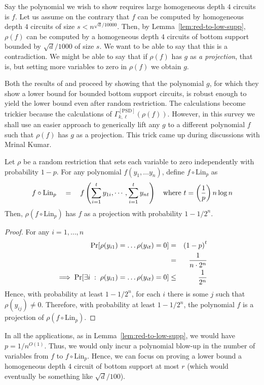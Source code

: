 Say the polynomial we wish to show requires large homogeneous depth $4$ circuits is $f$. Let us assume on the contrary that $f$ can be computed by homogeneous depth $4$ circuits of size $s < n^{\sqrt{d}/10000}$. Then, by Lemma~\ref{lem:red-to-low-supp}, $\rho(f)$ can be computed by a homogeneous depth $4$ circuits of bottom support bounded by $\sqrt{d}/1000$ of size $s$. We want to be able to say that this is a contradiction. We might be able to say that if $\rho(f)$ has $g$ as \emph{a projection}, that is, but setting more variables to zero in $\rho(f)$ we obtain $g$. 

Both the results of \cite{KLSS} and \cite{KS14} proceed by showing that the polynomial $g$, for which they show a lower bound for bounded bottom support circuits, is robust enough to yield the lower bound even after random restriction. The calculations become trickier because the calculations of $\Gamma^{[\mathrm{PSD}]}_{k,\ell}(\rho(f))$. However, in this survey we shall use an easier approach to generically lift any $g$ to a different polynomial $f$ such that $\rho(f)$ has $g$ as a projection. This trick came up during discussions with Mrinal Kumar. 

\begin{lemma}\label{lem:lin-transform-trick}
Let $\rho$ be a random restriction that sets each variable to zero independently with probability $1 - p$. For any polynomial $f(y_1,\dots y_n)$, define $f \circ \mathrm{Lin}_p$ as
\[
f \circ \mathrm{Lin}_p \quad = \quad f\left(\sum_{i=1}^t y_{1i}, \cdots, \sum_{i=1}^t y_{nt}\right)\quad \text{where $t = \left(\frac{1}{p}\right) n \log n$}
\]
Then, $\rho(f \circ \mathrm{Lin}_p)$ has $f$ as a projection with probability $1 - 1/2^{n}$. 
\end{lemma}
\begin{proof} For any $i = 1, \dots, n$
\begin{eqnarray*}
\quad \Pr[\rho(y_{i1}) = \dots \rho(y_{it}) = 0 ] & = & \left(1 - p\right)^t\\ 
& = & \frac{1}{n\cdot 2^n}\\
\implies \Pr[\exists i\;:\;\rho(y_{i1}) = \dots \rho(y_{it}) = 0 ]  & \leq  & \frac{1}{2^n} 
\end{eqnarray*}
Hence, with probability at least $1 - 1/2^n$, for each $i$ there is some $j$ such that $\rho(y_{ij}) \neq 0$. Therefore, with probability at least $1 - 1/2^n$, the polynomial $f$ is a projection of $\rho(f \circ \mathrm{Lin}_p)$. \end{proof}

In all the applications, as in Lemma~\ref{lem:red-to-low-supp}, we would have $p = 1/n^{O(1)}$. Thus, we would only incur a polynomial blow-up in the number of variables from $f$ to $f\circ \mathrm{Lin}_p$. Hence, we can focus on proving a lower bound  a homogeneous depth $4$ circuit of bottom support at most $r$ (which would eventually be something like $\sqrt{d}/100$). 

